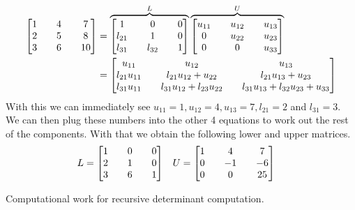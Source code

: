 \documentclass[boxes,pages]{homework}
\begin{document}
\begin{solution}
	\begin{align*}
		\mqty[1 && 4 && 7 \\ 2 && 5 && 8 \\ 3 && 6 && 10] &= \overbrace{\mqty[1 && 0 && 0 \\ l_{21} && 1 && 0 \\ l_{31} && l_{32} && 1]}^L \overbrace{\mqty[u_{11} && u_{12} && u_{13} \\ 0 && u_{22} && u_{23} \\ 0 && 0 && u_{33}]}^U \\
		&= \mqty[u_{11} && u_{12} && u_{13} \\ l_{21}u_{11} && l_{21}u_{12} + u_{22} && l_{21}u_{13} + u_{23} \\ l_{31}u_{11} && l_{31}u_{12} + l_{23}u_{22} && l_{31}u_{13} + l_{32}u_{23} + u_{33}]
	\end{align*}
	With this we can immediately see $u_{11} = 1, u_{12} = 4, u_{13} = 7, l_{21} = 2$ and $l_{31} = 3$. We can then plug these numbers into the other 4 equations to work out the rest of the components. With that we obtain the following lower and upper matrices.
	\begin{align*}
		L &= \mqty[1 && 0 && 0 \\ 2 && 1 && 0 \\ 3 && 6 && 1] & U & = \mqty[1 && 4 && 7 \\ 0 && -1 && -6 \\ 0 && 0 && 25]
	\end{align*}
\end{solution}

\begin{problem}
Computational work for recursive determinant computation.
\end{problem}
\end{document}
